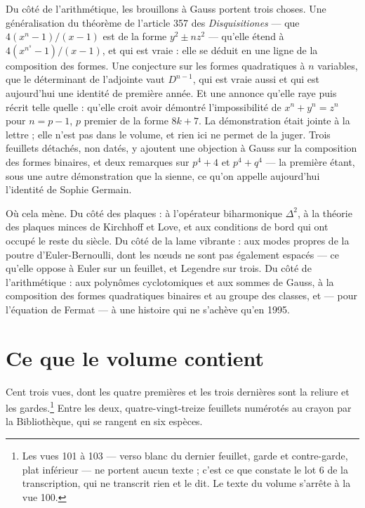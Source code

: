 \documentclass[11pt,a4paper]{article}
\begin{document}
\begin{resume}
Du côté de l'arithmétique, les brouillons à Gauss portent trois choses. Une
généralisation du théorème de l'article 357 des \emph{Disquisitiones} — que
$4(x^n-1)/(x-1)$ est de la forme $y^2 \pm n z^2$ — qu'elle étend à
$4(x^{n^s}-1)/(x-1)$, et qui est vraie : elle se déduit en une ligne de la
composition des formes. Une conjecture sur les formes quadratiques à $n$
variables, que le déterminant de l'adjointe vaut $D^{n-1}$, qui est vraie
aussi et qui est aujourd'hui une identité de première année. Et une annonce
qu'elle raye puis récrit telle quelle : qu'elle croit avoir démontré
l'impossibilité de $x^n + y^n = z^n$ pour $n = p - 1$, $p$ premier de la forme
$8k+7$. La démonstration était jointe à la lettre ; elle n'est pas dans le
volume, et rien ici ne permet de la juger. Trois feuillets détachés, non
datés, y ajoutent une objection à Gauss sur la composition des formes binaires,
et deux remarques sur $p^4+4$ et $p^4+q^4$ — la première étant, sous une autre
démonstration que la sienne, ce qu'on appelle aujourd'hui l'identité de Sophie
Germain.

Où cela mène. Du côté des plaques : à l'opérateur biharmonique $\Delta^2$, à
la théorie des plaques minces de Kirchhoff et Love, et aux conditions de bord
qui ont occupé le reste du siècle. Du côté de la lame vibrante : aux modes
propres de la poutre d'Euler-Bernoulli, dont les nœuds ne sont pas également
espacés — ce qu'elle oppose à Euler sur un feuillet, et Legendre sur trois.
Du côté de l'arithmétique : aux polynômes cyclotomiques et aux sommes de
Gauss, à la composition des formes quadratiques binaires et au groupe des
classes, et — pour l'équation de Fermat — à une histoire qui ne s'achève
qu'en 1995.

\end{resume}

\section*{Ce que le volume contient}

Cent trois vues, dont les quatre premières et les trois dernières sont la
reliure et les gardes.\footnote{Les vues 101 à 103 — verso blanc du dernier
feuillet, garde et contre-garde, plat inférieur — ne portent aucun texte ;
c'est ce que constate le lot 6 de la transcription, qui ne transcrit rien et
le dit. Le texte du volume s'arrête à la vue 100.} Entre les deux,
quatre-vingt-treize feuillets numérotés au crayon par la Bibliothèque, qui se
rangent en six espèces.
\end{document}
